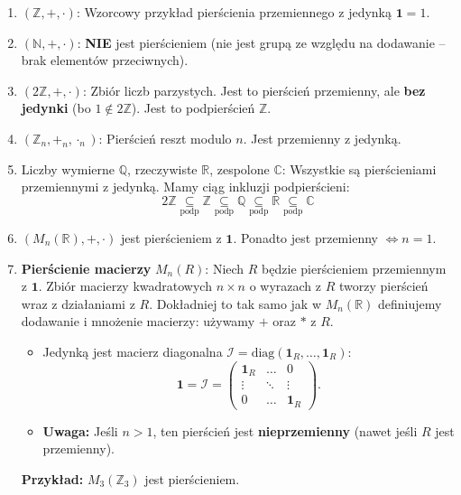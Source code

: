 \begin{enumerate}[label=\arabic*)]
    \item $(\mathbb{Z}, +, \cdot)$: Wzorcowy przykład pierścienia przemiennego z jedynką $\mathbf{1}=1$.
    
    \item $(\mathbb{N}, +, \cdot)$: \textbf{NIE} jest pierścieniem (nie jest grupą ze względu na dodawanie – brak elementów przeciwnych).
    
    \item $(2\mathbb{Z}, +, \cdot)$: Zbiór liczb parzystych. Jest to pierścień przemienny, ale \textbf{bez jedynki} (bo $1 \notin 2\mathbb{Z}$). Jest to podpierścień $\mathbb{Z}$.
    
    \item $(\mathbb{Z}_n, +_n, \cdot_n)$: Pierścień reszt modulo $n$. Jest przemienny z jedynką.
    
    \item Liczby wymierne $\mathbb{Q}$, rzeczywiste $\mathbb{R}$, zespolone $\mathbb{C}$: Wszystkie są pierścieniami przemiennymi z jedynką. Mamy ciąg inkluzji podpierścieni:
    \[ 2\mathbb{Z} \underset{\text{podp}}{\subseteq} \mathbb{Z} \underset{\text{podp}}{\subseteq} \mathbb{Q} \underset{\text{podp}}{\subseteq} \mathbb{R} \underset{\text{podp}}{\subseteq} \mathbb{C} \]
    
    \item $\left( M_{n} \left( \mathbb{R}  \right), +, \cdot   \right) $ jest pierścieniem z $\mathbf{1}$. Ponadto jest przemienny $\iff n = 1$.

    \item \textbf{Pierścienie macierzy} $M_n(R)$:
    Niech $R$ będzie pierścieniem przemiennym z $\mathbf{1}$. Zbiór macierzy kwadratowych $n \times n$ o wyrazach z $R$ tworzy pierścień wraz z działaniami z $R$. Dokładniej to tak samo jak w $M_{n}\left( \mathbb{R}  \right) $ definiujemy dodawanie i mnożenie macierzy: używamy $+$ oraz  $*$ z $R$. 
    \begin{itemize}
        \item Jedynką jest macierz diagonalna $\mathcal{I} = \text{diag}(\mathbf{1}_R, \dots, \mathbf{1}_R)$:
	\[
		\mathbf{1} = \mathcal{I} = \begin{pmatrix} \mathbf{1}_{R} & \ldots & 0 \\ \vdots & \ddots & \vdots \\ 0 & \ldots & \mathbf{1}_{R} \end{pmatrix} 
	.\] 
        \item \textbf{Uwaga:} Jeśli $n > 1$, ten pierścień jest \textbf{nieprzemienny} (nawet jeśli $R$ jest przemienny).
    \end{itemize}
    \textbf{Przykład:} $M_3\left( \mathbb{Z} _{3} \right) $ jest pierścieniem. 
    

\end{enumerate}
